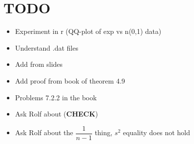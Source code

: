 \section{TODO}\par
\begin{itemize}
  \item Experiment in r (QQ-plot of exp vs n(0,1) data)
  \item Understand .dat files
  \item Add from slides
  \item Add proof from book of theorem 4.9 
  \item Problems 7.2.2 in the book
  \item Ask Rolf about (\textbf{CHECK})
  \item Ask Rolf about the $\dfrac{1}{n-1}$ thing, $s^2$ equality does not hold
\end{itemize}
